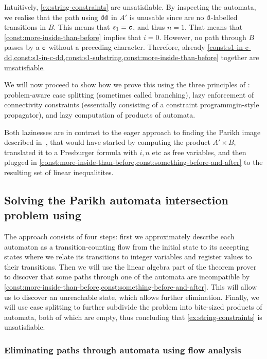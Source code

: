 Intuitively, \cref{ex:string-constraints} are unsatisfiable. By inspecting the
automata, we realise that the path using $\texttt{dd}$ in $A'$ is unusable since
are no $\texttt{d}$-labelled transitions in $B$. This means that $s_1 = \texttt{c}$,
and thus $n = 1$. That means that \cref{const:more-inside-than-before} implies
that $i = 0$. However, no path through $B$ passes by a $\texttt{c}$ without a
preceding character. Therefore, already
\cref{const:s1-in-c-dd,const:s1-in-c-dd,const:s1-substring,const:more-inside-than-before}
together are unsatisfiable.

We will now proceed to show how we prove this using the three principles of
\Calculus{}: problem-aware case splitting (sometimes called branching), lazy
enforcement of connectivity constraints (essentially consisting of a constraint
programmgin-style propagator), and lazy computation of products of automata.

Both lazinesses are in contrast to the eager approach to finding the Parikh
image described in~\cite{generate-parikh-image}, that would have started by
computing the product $A' \times B$, translated it to a Presburger formula with
$i, n$ etc as free variables, and then plugged in
\cref{const:more-inside-than-before,const:something-before-and-after} to the
resulting set of linear inequalitites.

\subsection{Solving the Parikh automata intersection problem using \Calculus{}}

The approach consists of four steps: first we approximately describe each
automaton as a transition-counting flow from the initial state to its accepting
states where we relate its transitions to integer variables and register values
to their transitions. Then we will use the linear algebra part of the theorem
prover to discover that some paths through one of the automata are incompatible
by \cref{const:more-inside-than-before,const:something-before-and-after}. This
will allow us to discover an unreachable state, which allows further
elimination. Finally, we will use case splitting to further subdivide the
problem into bite-sized products of automata, both of which are empty, thus
concluding that \cref{ex:string-constraints} is unsatisfiable.

\subsubsection{Eliminating paths through automata using flow analysis}

